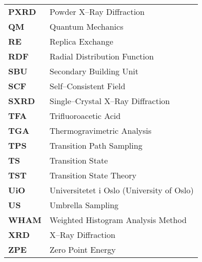 \begin{longtable}{p{} p{}}
\textbf{PXRD} & Powder X--Ray Diffraction\\
\textbf{QM} & Quantum Mechanics \\
\textbf{RE} & Replica Exchange \\
\textbf{RDF} & Radial Distribution Function \\
\textbf{SBU} & Secondary Building Unit \\
\textbf{SCF} & Self--Consistent Field\\
\textbf{SXRD} & Single--Crystal X--Ray Diffraction\\
\textbf{TFA} & Trifluoroacetic Acid\\
\textbf{TGA} & Thermogravimetric Analysis\\
\textbf{TPS} & Transition Path Sampling  \\
\textbf{TS}  & Transition State \\
\textbf{TST} & Transition State Theory  \\
\textbf{UiO} & Universitetet i Oslo (University of Oslo) \\ 
\textbf{US} & Umbrella Sampling  \\
\textbf{WHAM} & Weighted Histogram Analysis Method \\
\textbf{XRD} & X--Ray Diffraction\\
\textbf{ZPE} & Zero Point Energy\\
\end{longtable}